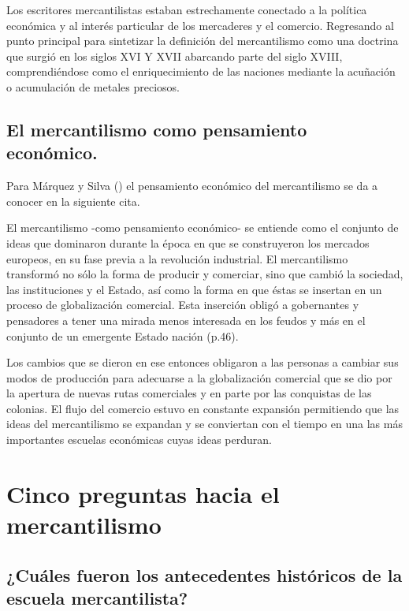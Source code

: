 \documentclass[
  stu,
  floatsintext,
  longtable,
  a4paper,
  nolmodern,
  notxfonts,
  notimes,
  12pt,
  colorlinks=true,linkcolor=blue,citecolor=blue,urlcolor=blue]{apa7}
\begin{document}
Los escritores mercantilistas estaban estrechamente conectado a la
política económica y al interés particular de los mercaderes y el
comercio. Regresando al punto principal para sintetizar la definición
del mercantilismo como una doctrina que surgió en los siglos XVI Y XVII
abarcando parte del siglo XVIII, comprendiéndose como el enriquecimiento
de las naciones mediante la acuñación o acumulación de metales
preciosos.

\subsection{El mercantilismo como pensamiento
económico.}\label{el-mercantilismo-como-pensamiento-econuxf3mico.}

Para Márquez y Silva
() el pensamiento
económico del mercantilismo se da a conocer en la siguiente cita.

El mercantilismo -como pensamiento económico- se entiende como el
conjunto de ideas que dominaron durante la época en que se construyeron
los mercados europeos, en su fase previa a la revolución industrial. El
mercantilismo transformó no sólo la forma de producir y comerciar, sino
que cambió la sociedad, las instituciones y el Estado, así como la forma
en que éstas se insertan en un proceso de globalización comercial. Esta
inserción obligó a gobernantes y pensadores a tener una mirada menos
interesada en los feudos y más en el conjunto de un emergente Estado
nación (p.46).

Los cambios que se dieron en ese entonces obligaron a las personas a
cambiar sus modos de producción para adecuarse a la globalización
comercial que se dio por la apertura de nuevas rutas comerciales y en
parte por las conquistas de las colonias. El flujo del comercio estuvo
en constante expansión permitiendo que las ideas del mercantilismo se
expandan y se conviertan con el tiempo en una las más importantes
escuelas económicas cuyas ideas perduran.

\section{Cinco preguntas hacia el
mercantilismo}\label{cinco-preguntas-hacia-el-mercantilismo}

\subsection{¿Cuáles fueron los antecedentes históricos de la escuela
mercantilista?}\label{cuuxe1les-fueron-los-antecedentes-histuxf3ricos-de-la-escuela-mercantilista}
\end{document}
